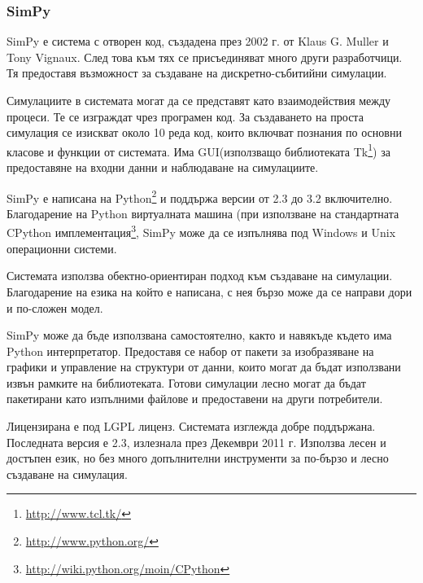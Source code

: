 		\subsubsection{SimPy}
			
			SimPy е система с отворен код, създадена през 2002 г. от Klaus G. Muller и Tony Vignaux. След това
			към тях се присъединяват много други разработчици. 
			Тя предоставя възможност за създаване на дискретно-събитийни симулации.
			
			
				Симулациите в системата могат да се представят като взаимодействия между процеси. Те се изграждат чрез
				програмен код. За създаването на проста симулация се изискват около 10 реда код, 
				които включват познания по основни класове и функции от системата. Има GUI(използващо библиотеката 
				Tk\footnote{\url{http://www.tcl.tk/}}) за предоставяне на входни данни и наблюдаване на симулациите.						
			
			
				SimPy е написана на Python\footnote{\url{http://www.python.org/}} и поддържа версии от 2.3 до 3.2 включително.
				Благодарение на Python виртуалната машина (при използване на стандартната CPython 
				имплементация\footnote{\url{http://wiki.python.org/moin/CPython}}, SimPy може да се изпълнява под 
				Windows и Unix операционни системи.
			
			
				Системата използва обектно-ориентиран подход към създаване на симулации. Благодарение на езика на който е
				написана, с нея бързо може да се направи дори и по-сложен модел.
			
						
				SimPy може да бъде използвана самостоятелно, както и навякъде където има Python интерпретатор.
				Предоставя се набор от пакети за изобразяване на графики и управление на структури от данни, които могат
				да бъдат използвани извън рамките на библиотеката. Готови симулации лесно могат да бъдат пакетирани
				като изпълними файлове и предоставени на други потребители.

			
				Лицензирана е под \ac{LGPL} лиценз. Системата изглежда добре поддържана. Последната версия е 2.3, излезнала през 
				Декември 2011 г. Използва лесен и достъпен език, но без много допълнителни инструменти за по-бързо и лесно
				създаване на симулация. \cite{SimPy}
				
